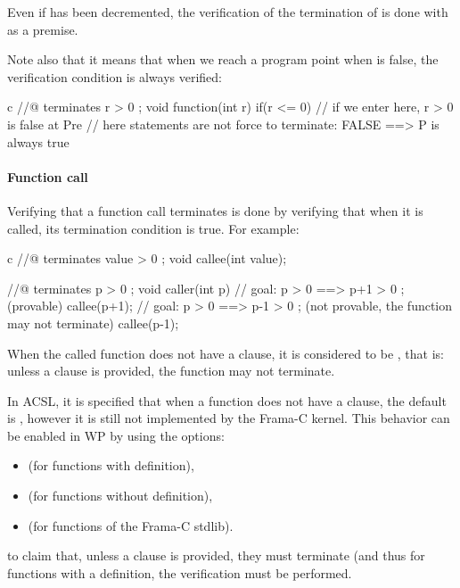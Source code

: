 Even if  has been decremented, the verification of the
termination of  is done with  as a
premise.



Note also that it means that when we reach a program point when 
is false, the verification condition is always verified:



\begin{CodeBlock}{c}
//@ terminates r > 0 ;
void function(int r){
  if(r <= 0){ // if we enter here, r > 0 is false at Pre
    // here statements are not force to terminate: FALSE ==> P is always true
  }
}
\end{CodeBlock}



\paragraph{Function call}



Verifying that a function call terminates is done by verifying that when it is
called, its termination condition is true. For example:



\begin{CodeBlock}{c}
//@ terminates value > 0 ;
void callee(int value);

//@ terminates p > 0 ;
void caller(int p){
  // goal: p > 0 ==> p+1 > 0 ; (provable)
  callee(p+1);
  // goal: p > 0 ==> p-1 > 0 ; (not provable, the function may not terminate)
  callee(p-1);
}
\end{CodeBlock}






When the called function does not have a  clause, it
is considered to be , that is: unless a
 clause is provided, the function may not terminate.




\begin{Information}
  In ACSL, it is specified that when a function does not have a
   clause, the default is
  , however it is still not
  implemented by the Frama-C kernel. This behavior can be enabled in WP
  by using the options:
  \begin{itemize}
  \item {} (for functions with definition),
  \item {} (for functions without definition),
  \item {} (for functions of the Frama-C stdlib).
  \end{itemize}
  to claim that, unless a clause is provided, they must terminate (and thus
  for functions with a definition, the verification must be performed.
\end{Information}


